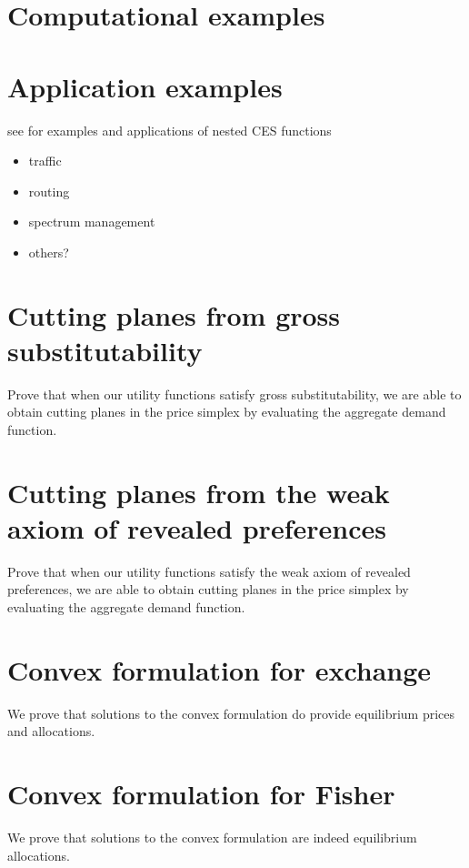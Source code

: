\documentclass[12pt]{article}
\begin{document}
\section{Computational examples}

\section{Application examples}
\cite{shoven1992applying}

see \cite{shoven1992applying} for examples and applications of nested CES functions

\begin{itemize}
\item traffic
\item routing
\item spectrum management
\item others?
\end{itemize}

\appendix
\section{Cutting planes from gross substitutability}
Prove that when our utility functions satisfy gross substitutability,
we are able to obtain cutting
planes in the price simplex by evaluating the aggregate demand function.

\section{Cutting planes from the weak axiom of revealed preferences}
Prove that when our utility functions satisfy the
weak axiom of revealed preferences, we are able to obtain cutting
planes in the price simplex by evaluating the aggregate demand function.

\section{Convex formulation for exchange}
We prove that solutions to the convex formulation %
do provide equilibrium prices and allocations.

\section{Convex formulation for Fisher}
\label{sec:fisher_proof}
We prove that solutions to the convex formulation %
are indeed equilibrium allocations.
\end{document}
